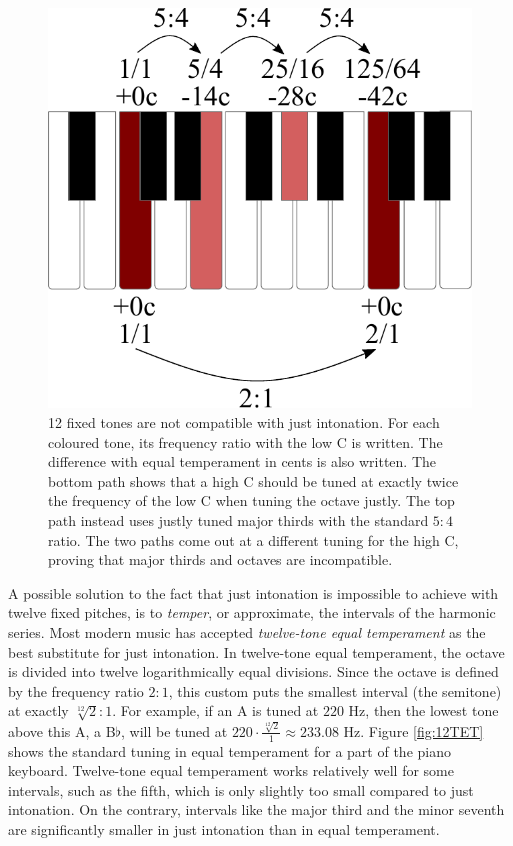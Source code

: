\documentclass[a4paper]{article}
\begin{document}
\begin{figure}
	\centering
	\includegraphics[width=0.6\linewidth]{Figures/ThirdsProof.pdf}
	\caption{12 fixed tones are not compatible with just intonation. For each coloured tone, its frequency ratio with the low C is written. The difference with equal temperament in cents is also written. The bottom path shows that a high C should be tuned at exactly twice the frequency of the low C when tuning the octave justly. The top path instead uses justly tuned major thirds with the standard $5:4$ ratio. The two paths come out at a different tuning for the high C, proving that major thirds and octaves are incompatible.}
	\label{fig:thirdsproof}
\end{figure}

A possible solution to the fact that just intonation is impossible to achieve with twelve fixed pitches, is to \textit{temper}, or approximate, the intervals of the harmonic series. Most modern music has accepted \textit{twelve-tone equal temperament} as the best substitute for just intonation. In twelve-tone equal temperament, the octave is divided into twelve logarithmically equal divisions. Since the octave is defined by the frequency ratio $2:1$, this custom puts the smallest interval (the semitone) at exactly $\sqrt[12]{2}:1$. \cite{van_de_craats_fis_1989} For example, if an A is tuned at $220$ Hz, then the lowest tone above this A, a B$\flat$, will be tuned at $220\cdot \frac{\sqrt[12]{2}}{1} \approx 233.08$ Hz. Figure \ref{fig:12TET} shows the standard tuning in equal temperament for a part of the piano keyboard. Twelve-tone equal temperament works relatively well for some intervals, such as the fifth, which is only slightly too small compared to just intonation. On the contrary, intervals like the major third and the minor seventh are significantly smaller in just intonation than in equal temperament.
\end{document}
